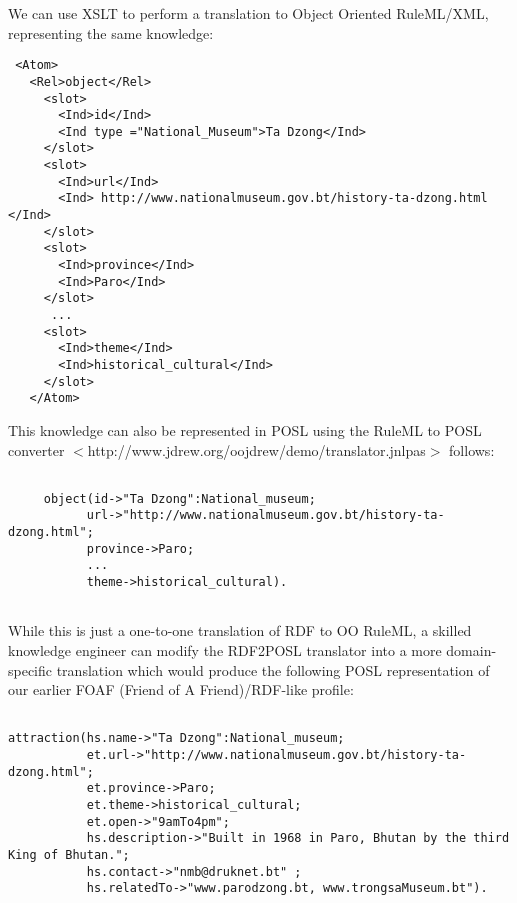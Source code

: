 \documentclass [letterpaper] {Article}
\begin{document}
\begin{small}
\hspace{0.1in}We can use XSLT to perform a translation to Object Oriented RuleML/XML, representing the same knowledge: 

\begin{small}
\singlespacing
\begin{verbatim}
 <Atom>
   <Rel>object</Rel>
     <slot>
       <Ind>id</Ind>
       <Ind type ="National_Museum">Ta Dzong</Ind>
     </slot>
     <slot>
       <Ind>url</Ind>
       <Ind> http://www.nationalmuseum.gov.bt/history-ta-dzong.html </Ind>
     </slot> 
     <slot>
       <Ind>province</Ind>
       <Ind>Paro</Ind>
     </slot>
      ...
     <slot>
       <Ind>theme</Ind>
       <Ind>historical_cultural</Ind>
     </slot>
   </Atom>
 \end{verbatim}
 \end{small}

This knowledge can also be represented in POSL using the RuleML to POSL converter $<$http://www.jdrew.org/oojdrew/demo/translator.jnlpas$>$\linebreak 
follows:

\begin{small}
\singlespacing
\begin{verbatim}
    
     object(id->"Ta Dzong":National_museum;
           url->"http://www.nationalmuseum.gov.bt/history-ta-dzong.html";
           province->Paro;
           ...
           theme->historical_cultural).
		       
\end{verbatim}
\end{small}	   

 
\hspace{0.1in}While this is just a one-to-one translation of RDF to OO RuleML, a skilled knowledge engineer can modify the RDF2POSL translator into a more domain-specific translation which would produce the following POSL representation of our earlier FOAF (Friend of A Friend)/RDF-like profile:
 
\begin{small}
\singlespacing
\begin{verbatim}
    
attraction(hs.name->"Ta Dzong":National_museum;
           et.url->"http://www.nationalmuseum.gov.bt/history-ta-dzong.html";
           et.province->Paro;
           et.theme->historical_cultural;
           et.open->"9amTo4pm";
           hs.description->"Built in 1968 in Paro, Bhutan by the third King of Bhutan.";
           hs.contact->"nmb@druknet.bt" ;
           hs.relatedTo->"www.parodzong.bt, www.trongsaMuseum.bt").
           

\end{verbatim}
\end{small}
\end{small}
\end{document}
